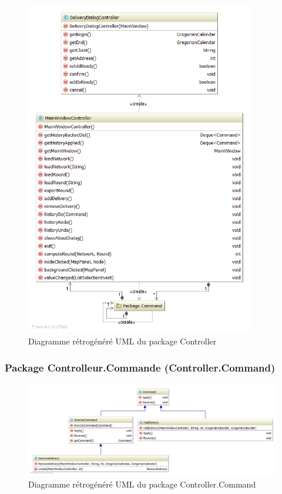 \begin{figure}[h]
    \centering
    \includegraphics[width=100mm]{../diagrams/classes_packages/final_classes_packages/controller/controller.png}
    \caption{Diagramme r\'etrog\'en\'er\'e UML du package Controller}
    \label{diagram:gen_uml_controller}
\end{figure}
\pagebreak

\begin{landscape}
\subsubsection{Package Controlleur.Commande (Controller.Command)}

\begin{figure}[h]
    \centering
    \includegraphics[width=240mm]{../diagrams/classes_packages/final_classes_packages/controller/package_command.png}
    \caption{Diagramme r\'etrog\'en\'er\'e UML du package Controller.Command}
    \label{diagram:gen_uml_controller_command}
\end{figure}
\end{landscape}

